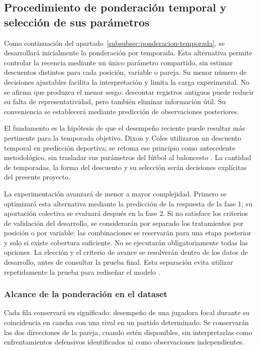 \subsection{Procedimiento de ponderación temporal y selección de sus parámetros}
\label{subsec:procedimiento-ponderacion-temporal}
Como continuación del apartado~\ref{subsubsec:ponderacion-temporada}, se desarrollará inicialmente la ponderación por temporada. Esta alternativa permite controlar la recencia mediante un único parámetro compartido, sin estimar descuentos distintos para cada posición, variable o pareja. Su menor número de decisiones ajustables facilita la interpretación y limita la carga experimental. No se afirma que produzca el menor sesgo: descontar registros antiguos puede reducir su falta de representatividad, pero también eliminar información útil. Su conveniencia se establecerá mediante predicción de observaciones posteriores.

El fundamento es la hipótesis de que el desempeño reciente puede resultar más pertinente para la temporada objetivo. Dixon y Coles utilizaron un descuento temporal en predicción deportiva; se retoma ese principio como antecedente metodológico, sin trasladar sus parámetros del fútbol al baloncesto \cite{dixon1997scores}. La cantidad de temporadas, la forma del descuento y su selección serán decisiones explícitas del presente proyecto.

La experimentación avanzará de menor a mayor complejidad. Primero se optimizará esta alternativa mediante la predicción de la respuesta de la fase 1; su aportación colectiva se evaluará después en la fase 2. Si no satisface los criterios de validación del desarrollo, se considerarán por separado los tratamientos por posición o por variable; las combinaciones se reservarán para una etapa posterior y solo si existe cobertura suficiente. No se ejecutarán obligatoriamente todas las opciones. La elección y el criterio de avance se resolverán dentro de los datos de desarrollo, antes de consultar la prueba final. Esta separación evita utilizar repetidamente la prueba para rediseñar el modelo \cite{cawley2010selection}.

\subsubsection*{Alcance de la ponderación en el dataset}
Cada fila conservará su significado: desempeño de una jugadora focal durante su coincidencia en cancha con una rival en un partido determinado. Se conservarán las dos direcciones de la pareja, cuando estén disponibles, sin interpretarlas como enfrentamientos defensivos identificados ni como observaciones independientes.

